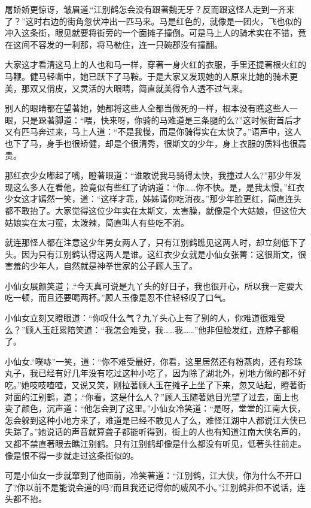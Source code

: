 \documentclass[12pt,oneside]{book}
\begin{document}
屠娇娇更惊讶，皱眉道.``江别鹤怎会没有跟著魏无牙？反而跟这怪人走到一齐来了？''这时右边的街角忽伏冲出一匹马来。马是红色的，就像是一团火，飞也似的冲入这条街，眼见就要将街旁的一个面摊子撞倒。可是马上人的骑术实在不错，竟在这间不容发的一利那，将马勒住，连一只碗郡没有撞翻。

大家这才看清这马上的人也和马一样，穿著一身火红的衣服，手里还提著根火红的马鞭。健马轻嘶中，她已跃下了马鞍。于是大家又发现她的人原来比她的骑术更美，那双又俏皮，又灵活的大眼睛，简直就美得令人透不过气来。

别人的眼睛都在望著她，她都将这些人全都当做死的一样，根本没有瞧这些人一眼，只是跺著脚道：``喂，快来呀，你骑的马难道是三条腿的么?''这时候街首后才又有匹马奔过来，马上人道：``不是我慢，而是你骑得实在太快了。''语声中，这人也下了马，身手也很矫健，却是个很清秀，很斯文的少年，身上衣服的质料也很高贵。

那红衣少女嘟起了嘴，瞪著眼道：``谁敢说我马骑得太快，我撞过人么?''那少年发现这么多人在看他，脸竟似有些红了讷讷道：``你\ldots\ldots 你不快。是，是我太慢。''红衣少女这才嫣然一笑，道：``这样才乖，姊姊请你吃消夜。''那少年脸更红，简直连头都不敢抬了。大家觉得这位少年实在太斯文，太害臊，就像是个大姑娘，但这位大姑娘实在太刁蛮，太泼辣，简直叫人有些吃不消。

就连那怪人都在注意这少年男女两人了，只有江别鹤瞧见这两人时，却立刻低下了头。因为只有江别鹤认得这两人是谁。这红衣少女就是小仙女张菁：这很斯文，很害羞的少年人，自然就是神拳世家的公子顾人玉了。

小仙女展颜笑道；.``今天真可说是九丫头的好日子，我也很开心，所以我一定要大吃一顿，而且还要喝两杯。''顾人玉像是忍不住轻轻叹了口气。

小仙女立刻又瞪眼道：``你叹什么气？九丫头心上有了别的人，你难道很难受么？''顾人玉赶累陪笑道：``我怎会难受，我\ldots\ldots 我\ldots\ldots{}''他非但脸发红，连脖子都粗了。

小仙女.``噗哧''一笑，道：``你不难受最好，你看，这里居然还有粉蒸肉，还有珍珠丸子，我已经有好几年没有吃过这种小吃了，因为除了湖北外，别地方做的都不好吃。''她吱吱喳喳，又说又笑，刚拉著顾人玉在摊子上坐了下来，忽又站起，瞪著街对面的江别鹤，道；.``你看，这是什么人？''顾人玉随著她目光望了过去，面上也变了颜色，沉声道：``他怎会到了这里。''小仙女冷笑道：``是呀，堂堂的江南大侠，怎会躲到这种小地方来了，难道是已经不敢见人了么，难怪江湖中人都说江大侠已失踪了。''她说话的声音就算聋子都能听得到，街上的人也有知道江南大侠名声的，又都不禁直著眼去瞧江别鹤。只有江别鹤却像是什么都没有听见，低著头往前走。像是恨不得一步就走过这条街似的。

可是小仙女一步就窜到了他面前，冷笑著道：``江别鹤，江大侠，你为什么不开口了?你以前不是能说会道的吗?而且我还记得你的威风不小。''江别鹤非但不说话，连头都不抬。
\end{document}
